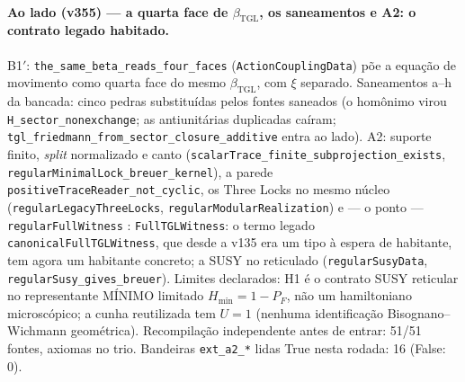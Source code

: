 \documentclass[11pt]{article}
\newcommand{\bTGL}{\beta_{\mathrm{TGL}}}\newcommand{\Msun}{M_{\odot}}\newcommand{\TGL}{\mathrm{TGL}}
\theoremstyle{definition}\newtheorem{deriv}{Derivação}
\begin{document}
\paragraph*{Ao lado (v355) --- a quarta face de $\bTGL$, os saneamentos e A2: o contrato legado habitado.} B1$'$: \texttt{the\_same\_beta\_reads\_four\_faces} (\texttt{ActionCouplingData}) põe a equação de movimento como quarta face do mesmo $\bTGL$, com $\xi$ separado. Saneamentos a--h da bancada: cinco pedras substituídas pelos fontes saneados (o homônimo virou \texttt{H\_sector\_nonexchange}; as antiunitárias duplicadas caíram; \texttt{tgl\_friedmann\_from\_sector\_closure\_additive} entra ao lado). A2: suporte finito, \emph{split} normalizado e canto (\texttt{scalarTrace\_finite\_subprojection\_exists}, \texttt{regularMinimalLock\_breuer\_kernel}), a parede \texttt{positiveTraceReader\_not\_cyclic}, os Three Locks no mesmo núcleo (\texttt{regularLegacyThreeLocks}, \texttt{regularModularRealization}) e --- o ponto --- \texttt{regularFullWitness} : \texttt{FullTGLWitness}: o termo legado \texttt{canonicalFullTGLWitness}, que desde a v135 era um tipo à espera de habitante, tem agora um habitante concreto; a SUSY no reticulado (\texttt{regularSusyData}, \texttt{regularSusy\_gives\_breuer}). Limites declarados: H1 é o contrato SUSY reticular no representante MÍNIMO limitado $H_{\min}=1-P_F$, não um hamiltoniano microscópico; a cunha reutilizada tem $U=1$ (nenhuma identificação Bisognano--Wichmann geométrica). Recompilação independente antes de entrar: 51/51 fontes, axiomas no trio. Bandeiras \texttt{ext\_a2\_*} lidas True nesta rodada: 16 (False: 0).
\end{document}

